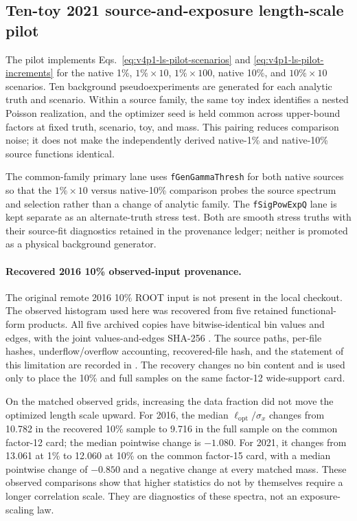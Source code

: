 \subsection{Ten-toy 2021 source-and-exposure length-scale pilot}
\label{sec:v4p1-ls-exposure-pilot}

The pilot implements Eqs.~\eqref{eq:v4p1-ls-pilot-scenarios} and
\eqref{eq:v4p1-ls-pilot-increments} for the native 1\%, $1\%\times10$,
$1\%\times100$, native 10\%, and $10\%\times10$ scenarios. Ten background
pseudoexperiments are generated for each analytic truth and scenario. Within a source
family, the same toy index identifies a nested Poisson realization, and the optimizer
seed is held common across upper-bound factors at fixed truth, scenario, toy, and mass.
This pairing reduces comparison noise; it does not make the independently derived
native-1\% and native-10\% source functions identical.

The common-family primary lane uses \texttt{fGenGammaThresh} for both native sources so
that the $1\%\times10$ versus native-10\% comparison probes the source spectrum and
selection rather than a change of analytic family. The \texttt{fSigPowExpQ} lane is
kept separate as an alternate-truth stress test. Both are smooth stress truths with
their source-fit diagnostics retained in the provenance ledger; neither is promoted as
a physical background generator.

\paragraph{Recovered 2016 10\% observed-input provenance.}
The original remote 2016 10\% ROOT input is not present in the local checkout. The
observed histogram used here was recovered from five retained functional-form products.
All five archived copies have bitwise-identical bin values and edges, with the joint
values-and-edges SHA-256
.
The source paths, per-file hashes, underflow/overflow accounting, recovered-file hash,
and the statement of this limitation are recorded in
.
The recovery changes no bin content and is used only to place the 10\% and full samples
on the same factor-12 wide-support card.

On the matched observed grids, increasing the data fraction did not move the optimized
length scale upward. For 2016, the median
$\ell_{\mathrm{opt}}/\sigma_x$ changes from 10.782 in the recovered 10\% sample to
9.716 in the full sample on the common factor-12 card; the median pointwise change is
$-1.080$. For 2021, it changes from 13.061 at 1\% to 12.060 at 10\% on the common
factor-15 card, with a median pointwise change of $-0.850$ and a negative change at
every matched mass. These observed comparisons show that higher statistics do not by
themselves require a longer correlation scale. They are diagnostics of these spectra,
not an exposure-scaling law.

